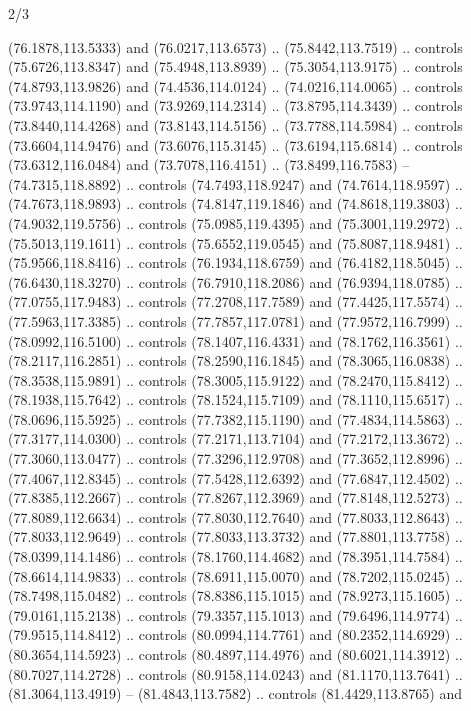 \begin{flagdescription}{2/3}
\begin{scope}[shift={(0.5\flaglength,0.5)},scale=\flagwidth/320]
\begin{scope}[y=0.8pt, x=0.8pt, yscale=-1,shift={(-118.3,-146)}]
  (76.1878,113.5333) and (76.0217,113.6573) .. (75.8442,113.7519) .. controls
  (75.6726,113.8347) and (75.4948,113.8939) .. (75.3054,113.9175) .. controls
  (74.8793,113.9826) and (74.4536,114.0124) .. (74.0216,114.0065) .. controls
  (73.9743,114.1190) and (73.9269,114.2314) .. (73.8795,114.3439) .. controls
  (73.8440,114.4268) and (73.8143,114.5156) .. (73.7788,114.5984) .. controls
  (73.6604,114.9476) and (73.6076,115.3145) .. (73.6194,115.6814) .. controls
  (73.6312,116.0484) and (73.7078,116.4151) .. (73.8499,116.7583) --
  (74.7315,118.8892) .. controls (74.7493,118.9247) and (74.7614,118.9597) ..
  (74.7673,118.9893) .. controls (74.8147,119.1846) and (74.8618,119.3803) ..
  (74.9032,119.5756) .. controls (75.0985,119.4395) and (75.3001,119.2972) ..
  (75.5013,119.1611) .. controls (75.6552,119.0545) and (75.8087,118.9481) ..
  (75.9566,118.8416) .. controls (76.1934,118.6759) and (76.4182,118.5045) ..
  (76.6430,118.3270) .. controls (76.7910,118.2086) and (76.9394,118.0785) ..
  (77.0755,117.9483) .. controls (77.2708,117.7589) and (77.4425,117.5574) ..
  (77.5963,117.3385) .. controls (77.7857,117.0781) and (77.9572,116.7999) ..
  (78.0992,116.5100) .. controls (78.1407,116.4331) and (78.1762,116.3561) ..
  (78.2117,116.2851) .. controls (78.2590,116.1845) and (78.3065,116.0838) ..
  (78.3538,115.9891) .. controls (78.3005,115.9122) and (78.2470,115.8412) ..
  (78.1938,115.7642) .. controls (78.1524,115.7109) and (78.1110,115.6517) ..
  (78.0696,115.5925) .. controls (77.7382,115.1190) and (77.4834,114.5863) ..
  (77.3177,114.0300) .. controls (77.2171,113.7104) and (77.2172,113.3672) ..
  (77.3060,113.0477) .. controls (77.3296,112.9708) and (77.3652,112.8996) ..
  (77.4067,112.8345) .. controls (77.5428,112.6392) and (77.6847,112.4502) ..
  (77.8385,112.2667) .. controls (77.8267,112.3969) and (77.8148,112.5273) ..
  (77.8089,112.6634) .. controls (77.8030,112.7640) and (77.8033,112.8643) ..
  (77.8033,112.9649) .. controls (77.8033,113.3732) and (77.8801,113.7758) ..
  (78.0399,114.1486) .. controls (78.1760,114.4682) and (78.3951,114.7584) ..
  (78.6614,114.9833) .. controls (78.6911,115.0070) and (78.7202,115.0245) ..
  (78.7498,115.0482) .. controls (78.8386,115.1015) and (78.9273,115.1605) ..
  (79.0161,115.2138) .. controls (79.3357,115.1013) and (79.6496,114.9774) ..
  (79.9515,114.8412) .. controls (80.0994,114.7761) and (80.2352,114.6929) ..
  (80.3654,114.5923) .. controls (80.4897,114.4976) and (80.6021,114.3912) ..
  (80.7027,114.2728) .. controls (80.9158,114.0243) and (81.1170,113.7641) ..
  (81.3064,113.4919) -- (81.4843,113.7582) .. controls (81.4429,113.8765) and

\end{scope}
\end{scope}
\end{flagdescription}
